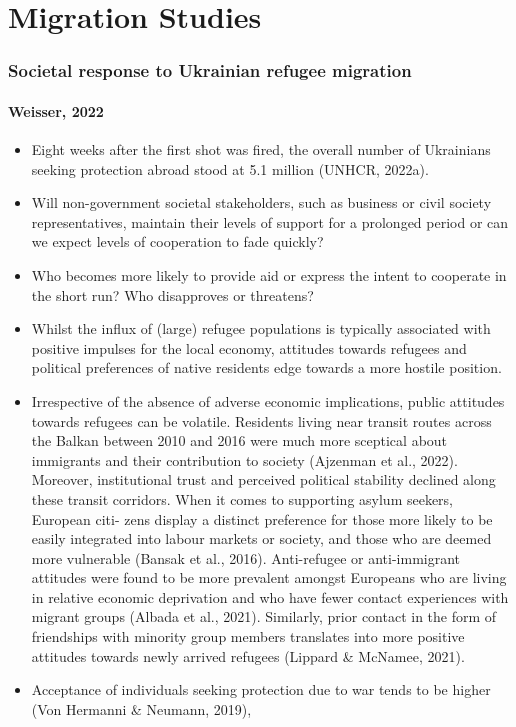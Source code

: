 \documentclass{beamer}
\begin{document}
\section[Migration Studies]{Migration Studies}

\begin{frame}
   \frametitle{Societal response to Ukrainian refugee migration}
   \framesubtitle{Weisser, 2022}
   \begin{itemize}
      \item Eight weeks after the first shot was fired, the overall number of
      Ukrainians seeking protection abroad stood at 5.1 million (UNHCR, 2022a).
      \item Will non-government societal stakeholders, such as business or civil
      society representatives, maintain their levels of support for a prolonged
      period or can we expect levels of cooperation to fade quickly?
      \item Who becomes more likely to provide aid or express the intent to
      cooperate in the short run? Who disapproves or threatens?
      \item Whilst the influx of (large) refugee populations is typically
      associated with positive impulses for the local economy, attitudes towards
      refugees and political preferences of native residents edge towards a more
      hostile position. 
      \item Irrespective of the absence of adverse economic implications, public attitudes towards refugees can be volatile.
      Residents living near transit routes across the Balkan between 2010 and 2016 were much more sceptical about
      immigrants and their contribution to society (Ajzenman et al., 2022). Moreover, institutional trust and perceived
      political stability declined along these transit corridors. When it comes to supporting asylum seekers, European citi-
      zens display a distinct preference for those more likely to be easily integrated into labour markets or society, and
      those who are deemed more vulnerable (Bansak et al., 2016). Anti-refugee or anti-immigrant attitudes were found to
      be more prevalent amongst Europeans who are living in relative economic deprivation and who have fewer contact
      experiences with migrant groups (Albada et al., 2021). Similarly, prior contact in the form of friendships with minority
      group members translates into more positive attitudes towards newly arrived refugees (Lippard \& McNamee, 2021).
      \item Acceptance of individuals seeking protection due to war tends to be higher (Von Hermanni \& Neumann, 2019),

\end{itemize}
\end{frame}
\end{document}
